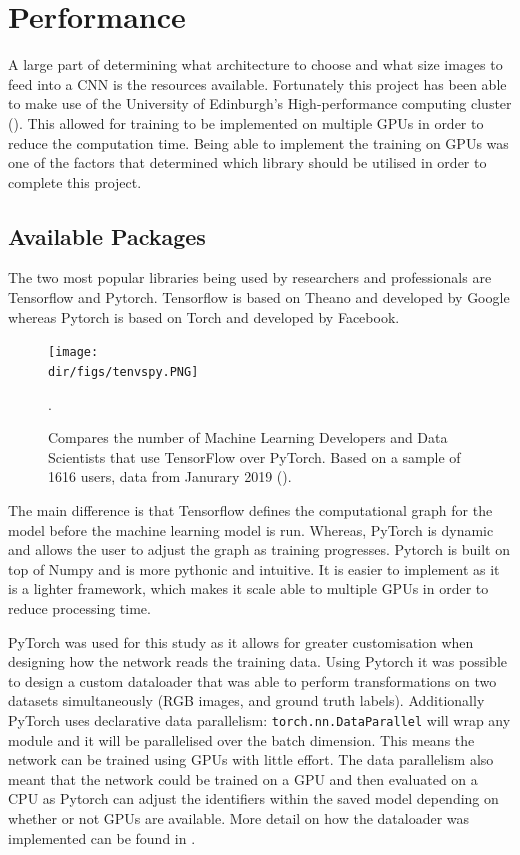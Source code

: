 \section{Performance}
A large part of determining what architecture to choose and what size images to feed into a CNN is the resources available. Fortunately this project has been able to make use of the University of Edinburgh's High-performance computing cluster (\cite{ecdf19}). This allowed for training to be implemented on multiple GPUs in order to reduce the computation time. Being able to implement the training on GPUs was one of the factors that determined which library should be utilised in order to complete this project.
\subsection{Available Packages}
The two most popular libraries being used by researchers and professionals are Tensorflow and Pytorch. Tensorflow is based on Theano and developed by Google whereas Pytorch is based on Torch and developed by Facebook.
\begin{figure}[htpb]
    \centering
    \texttt{[image: \\dir/figs/tenvspy.PNG]}
    \caption[TensorFlow versus PyTorch Usage]{Compares the number of Machine Learning Developers and Data Scientists that use TensorFlow over PyTorch. Based on a sample of 1616 users, data from Janurary 2019 (\cite{Rosenzvaig19}). }.
    \label{fig.tfvspy}
\end{figure}
The main difference is that Tensorflow defines the computational graph for the model before the machine learning model is run. Whereas, PyTorch is dynamic and allows the user to adjust the graph as training progresses. Pytorch is built on top of Numpy and is more pythonic and intuitive. It is easier to implement as it is a lighter framework, which makes it scale able to multiple GPUs in order to reduce processing time.
\par
PyTorch was used for this study as it allows for greater customisation when designing how the network reads the training data. Using Pytorch it was possible to design a custom dataloader that was able to perform transformations on two datasets simultaneously (RGB images, and ground truth labels). Additionally PyTorch uses declarative data parallelism:  \texttt{torch.nn.DataParallel} will wrap any module and it will be parallelised over the batch dimension. This means the network can be trained using GPUs with little effort. The data parallelism also meant that the network could be trained on a GPU and then evaluated on a CPU as Pytorch can adjust the identifiers within the saved model depending on whether or not GPUs are available. More detail on how the dataloader was implemented can be found in \citet{Richmond19b}.